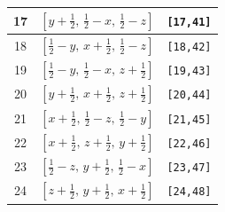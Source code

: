 \documentclass[fleqn,8pt]{jsarticle}
\begin{document}
\begin{longtable}{ccc}
17 & $\left[ y + \frac{1}{2},\, \frac{1}{2} - x,\, \frac{1}{2} - z \right]$ & {\tt [17,41]} \\ \hline
18 & $\left[ \frac{1}{2} - y,\, x + \frac{1}{2},\, \frac{1}{2} - z \right]$ & {\tt [18,42]} \\ \hline
19 & $\left[ \frac{1}{2} - y,\, \frac{1}{2} - x,\, z + \frac{1}{2} \right]$ & {\tt [19,43]} \\ \hline
20 & $\left[ y + \frac{1}{2},\, x + \frac{1}{2},\, z + \frac{1}{2} \right]$ & {\tt [20,44]} \\ \hline
21 & $\left[ x + \frac{1}{2},\, \frac{1}{2} - z,\, \frac{1}{2} - y \right]$ & {\tt [21,45]} \\ \hline
22 & $\left[ x + \frac{1}{2},\, z + \frac{1}{2},\, y + \frac{1}{2} \right]$ & {\tt [22,46]} \\ \hline
23 & $\left[ \frac{1}{2} - z,\, y + \frac{1}{2},\, \frac{1}{2} - x \right]$ & {\tt [23,47]} \\ \hline
24 & $\left[ z + \frac{1}{2},\, y + \frac{1}{2},\, x + \frac{1}{2} \right]$ & {\tt [24,48]} \\
\end{longtable}
\end{document}
